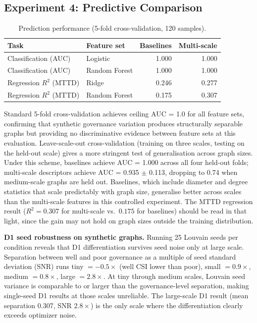 \documentclass[11pt,a4paper]{article}
\begin{document}
\subsection{Experiment 4: Predictive Comparison}

\begin{table}[htb]
\centering
\caption{Prediction performance (5-fold cross-validation, 120 samples).}
\label{tab:exp4}
\begin{tabular}{llrr}
\toprule
Task & Feature set & Baselines & Multi-scale \\
\midrule
Classification (AUC) & Logistic & 1.000 & 1.000 \\
Classification (AUC) & Random Forest & 1.000 & 1.000 \\
Regression $R^2$ (MTTD) & Ridge & 0.246 & 0.277 \\
Regression $R^2$ (MTTD) & Random Forest & 0.175 & 0.307 \\
\bottomrule
\end{tabular}
\end{table}

Standard 5-fold cross-validation achieves ceiling AUC = 1.0 for all
feature sets, confirming that synthetic governance variation produces
structurally separable graphs but providing no discriminative evidence
between feature sets at this evaluation. Leave-scale-out cross-validation
(training on three scales, testing on the held-out scale) gives a more
stringent test of generalisation across graph sizes. Under this scheme,
baselines achieve AUC = 1.000 across all four held-out folds; multi-scale
descriptors achieve AUC = 0.935 $\pm$ 0.113, dropping to 0.74 when
medium-scale graphs are held out. Baselines, which include diameter and
degree statistics that scale predictably with graph size, generalise
better across scales than the multi-scale features in this controlled
experiment. The MTTD regression result ($R^2 = 0.307$ for multi-scale vs.\
$0.175$ for baselines) should be read in that light, since the gain may
not hold on graph sizes outside the training distribution.

\textbf{D1 seed robustness on synthetic graphs.}
Running 25 Louvain seeds per condition reveals that D1 differentiation
survives seed noise only at large scale. Separation between well and
poor governance as a multiple of seed standard deviation (SNR) runs
tiny $= -0.5\times$ (well CSI lower than poor), small $= 0.9\times$,
medium $= 0.8\times$, large $= 2.8\times$. At tiny through medium
scales, Louvain seed variance is comparable to or larger than the
governance-level separation, making single-seed D1 results at those
scales unreliable. The large-scale D1 result (mean separation 0.307,
SNR $2.8\times$) is the only scale where the differentiation clearly exceeds
optimizer noise.
\end{document}

